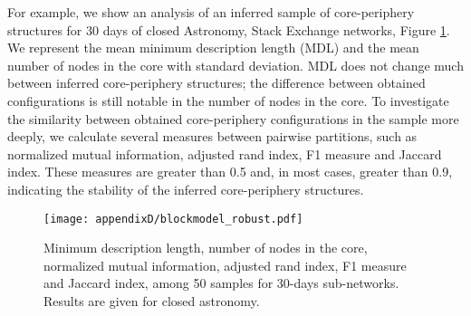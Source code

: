 \clearpage
For example, we show an analysis of an inferred sample of core-periphery structures for 30 days of closed Astronomy, Stack Exchange networks, Figure \ref{fig:sample}. We represent the mean minimum description length (MDL) and the mean number of nodes in the core with standard deviation. MDL does not change much between inferred core-periphery structures; the difference between obtained configurations is still notable in the number of nodes in the core. To investigate the similarity between obtained core-periphery configurations in the sample more deeply, we calculate several measures between pairwise partitions, such as normalized mutual information, adjusted rand index, F1 measure and Jaccard index. These measures are greater than 0.5 and, in most cases, greater than 0.9, indicating the stability of the inferred core-periphery structures.


\begin{figure}[h]
	\centering
	\texttt{[image: appendixD/blockmodel\_robust.pdf]}
	\caption[Stability of the core-periphery structures.]{Minimum description length, number of nodes in the core, normalized mutual information, adjusted rand index, F1 measure and Jaccard index, among 50 samples for 30-days sub-networks. Results are given for closed astronomy. }
	\label{fig:sample}
\end{figure}